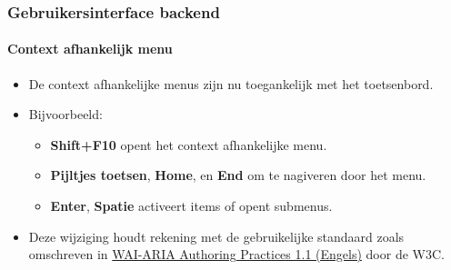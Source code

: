 %

\begin{frame}[fragile]
	\frametitle{Gebruikersinterface backend}
	\framesubtitle{Context afhankelijk menu}

	\begin{itemize}
		\item De context afhankelijke menus zijn nu toegankelijk met het toetsenbord.
		\item Bijvoorbeeld:

			\begin{itemize}\small
				\item \textbf{Shift+F10} opent het context afhankelijke menu.
				\item \textbf{Pijltjes toetsen}, \textbf{Home}, en \textbf{End} om te nagiveren door het menu.
				\item \textbf{Enter}, \textbf{Spatie} activeert items of opent submenus.
			\end{itemize}

		\item Deze wijziging houdt rekening met de gebruikelijke standaard zoals omschreven in
			\href{https://www.w3.org/TR/wai-aria-practices-1.1/#keyboard-interaction-12}{WAI-ARIA Authoring Practices 1.1 (Engels)}
			door de W3C.

	\end{itemize}

\end{frame}

